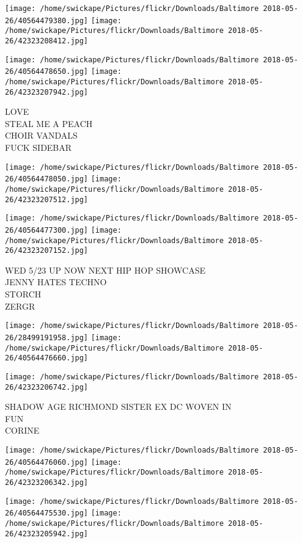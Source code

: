 \documentclass[10pt,letterpaper]{article}
\begin{document}
\texttt{[image: /home/swickape/Pictures/flickr/Downloads/Baltimore 2018-05-26/40564479380.jpg]}
\texttt{[image: /home/swickape/Pictures/flickr/Downloads/Baltimore 2018-05-26/42323208412.jpg]}

\texttt{[image: /home/swickape/Pictures/flickr/Downloads/Baltimore 2018-05-26/40564478650.jpg]}
\texttt{[image: /home/swickape/Pictures/flickr/Downloads/Baltimore 2018-05-26/42323207942.jpg]}

LOVE\\
STEAL ME A PEACH\\
CHOIR VANDALS\\
FUCK SIDEBAR\\
\pagebreak

\texttt{[image: /home/swickape/Pictures/flickr/Downloads/Baltimore 2018-05-26/40564478050.jpg]}
\texttt{[image: /home/swickape/Pictures/flickr/Downloads/Baltimore 2018-05-26/42323207512.jpg]}

\texttt{[image: /home/swickape/Pictures/flickr/Downloads/Baltimore 2018-05-26/40564477300.jpg]}
\texttt{[image: /home/swickape/Pictures/flickr/Downloads/Baltimore 2018-05-26/42323207152.jpg]}

WED 5/23 UP NOW NEXT HIP HOP SHOWCASE\\
JENNY HATES TECHNO\\
STORCH\\
ZERGR\\
\pagebreak

\texttt{[image: /home/swickape/Pictures/flickr/Downloads/Baltimore 2018-05-26/28499191958.jpg]}
\texttt{[image: /home/swickape/Pictures/flickr/Downloads/Baltimore 2018-05-26/40564476660.jpg]}

\vspace{0.25in}
\texttt{[image: /home/swickape/Pictures/flickr/Downloads/Baltimore 2018-05-26/42323206742.jpg]}

SHADOW AGE RICHMOND SISTER EX DC WOVEN IN\\
FUN\\
CORINE\\
\pagebreak

\texttt{[image: /home/swickape/Pictures/flickr/Downloads/Baltimore 2018-05-26/40564476060.jpg]}
\texttt{[image: /home/swickape/Pictures/flickr/Downloads/Baltimore 2018-05-26/42323206342.jpg]}

\texttt{[image: /home/swickape/Pictures/flickr/Downloads/Baltimore 2018-05-26/40564475530.jpg]}
\texttt{[image: /home/swickape/Pictures/flickr/Downloads/Baltimore 2018-05-26/42323205942.jpg]}
\end{document}
